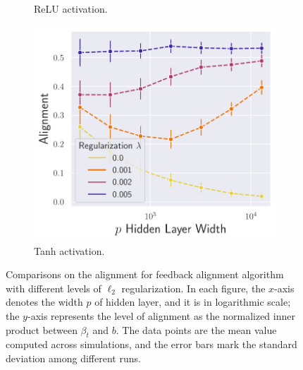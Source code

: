 \begin{figure}[h]
\begin{subfigure}[b]{.33\textwidth}
  \caption{ReLU activation.}
  \label{fig:align_nn_relu_autograd_l2}
\end{subfigure}\hfill
\begin{subfigure}[b]{.33\textwidth}
  \centering
  \includegraphics[width=\linewidth]{figures/df_nn_tanh_autograd_l2_v6.pdf}
  \caption{Tanh activation.}
  \label{fig:align_nn_tanh_autograd_l2}
\end{subfigure}
\caption{Comparisons on the alignment for feedback alignment algorithm with different levels of $\ell_2$ regularization. In each figure, the $x$-axis denotes the width $p$ of hidden layer, and it is in logarithmic scale; the $y$-axis represents the level of alignment as the normalized inner product between $\beta_t$ and $b$. The data points are the mean value computed across simulations, and the error bars mark the standard deviation among different runs.}
\label{fig:synthetic-l2}
\end{figure}

